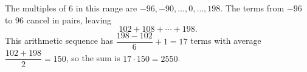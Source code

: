 The multiples of $6$ in this range are $-96,-90,\dots,0,\dots,198$. The terms from $-96$ to $96$ cancel in pairs, leaving
\[102+108+\cdots+198 .\]
This arithmetic sequence has $\dfrac{198-102}{6}+1=17$ terms with average $\dfrac{102+198}{2}=150$, so the sum is $17\cdot150=\boxed{2550}$.

